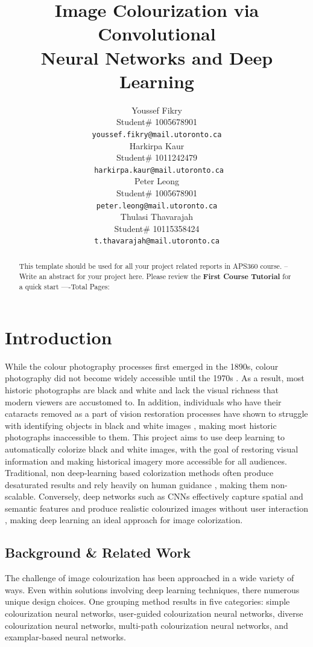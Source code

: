\documentclass{article} %
\title{Image Colourization via Convolutional \\
Neural Networks and Deep Learning}
\author{Youssef Fikry  \\
Student\# 1005678901\\
\texttt{youssef.fikry@mail.utoronto.ca} \\
\And
Harkirpa Kaur  \\
Student\# 1011242479 \\
\texttt{  harkirpa.kaur@mail.utoronto.ca} \\
\AND
Peter Leong \\
Student\# 1005678901 \\
\texttt{peter.leong@mail.utoronto.ca} \\
\And
Thulasi Thavarajah \\
Student\# 10115358424 \\
\texttt{t.thavarajah@mail.utoronto.ca} \\
\AND
}
\begin{document}
\maketitle

\begin{abstract}
This template should be used for all your project related reports in APS360 course. -- Write an abstract for your project here. Please review the \textbf{ First Course Tutorial} for a quick start
----Total Pages: \pageref{last_page}
\end{abstract}



\section{Introduction}

While the colour photography processes first emerged in the 1890s, colour photography did not become widely accessible until the 1970s \cite{scienceandmediamuseum2020}. As a result, 
most historic photographs are black and white and lack the visual richness that modern viewers are accustomed to. In addition, individuals who have their cataracts 
removed as a part of vision restoration processes have shown to struggle with identifying objects in black and white images \cite{vogelsang2024impact}, making most historic photographs 
inaccessible to them. This project aims to use deep learning to automatically colorize black and white images, with the goal of restoring visual information and 
making historical imagery more accessible for all audiences. Traditional, non deep-learning based colorization methods often produce desaturated results and rely 
heavily on human guidance \cite{cheng2016deepcolorization}, making them non-scalable. Conversely, deep networks such as CNNs effectively capture spatial and semantic features and produce 
realistic colourized images without user interaction \cite{zhang2016colorful}, making deep learning an ideal approach for image colorization.

\subsection{Background \& Related Work}

The challenge of image colourization has been approached in a wide variety of ways. Even within solutions involving deep learning
techniques, there numerous unique design choices. One grouping method \cite{zeger2021grayscale} results in five categories: simple colourization neural networks,
user-guided colourization neural networks, diverse colourization neural networks, multi-path colourization neural networks, and examplar-based
neural networks. 
\end{document}
